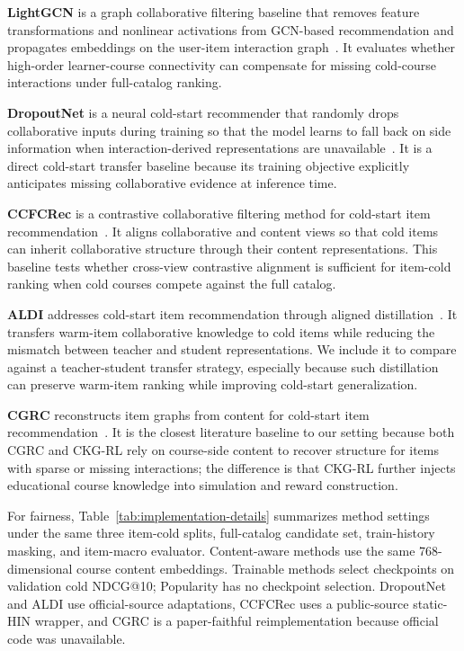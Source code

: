 \documentclass[sigconf,anonymous,review]{acmart}
\begin{document}
\textbf{LightGCN} is a graph collaborative filtering baseline that removes feature transformations and nonlinear activations from GCN-based recommendation and propagates embeddings on the user-item interaction graph~\cite{he2020lightgcn}. It evaluates whether high-order learner-course connectivity can compensate for missing cold-course interactions under full-catalog ranking.

\textbf{DropoutNet} is a neural cold-start recommender that randomly drops collaborative inputs during training so that the model learns to fall back on side information when interaction-derived representations are unavailable~\cite{volkovs2017dropoutnet}. It is a direct cold-start transfer baseline because its training objective explicitly anticipates missing collaborative evidence at inference time.

\textbf{CCFCRec} is a contrastive collaborative filtering method for cold-start item recommendation~\cite{zhou2023ccfcrec}. It aligns collaborative and content views so that cold items can inherit collaborative structure through their content representations. This baseline tests whether cross-view contrastive alignment is sufficient for item-cold ranking when cold courses compete against the full catalog.

\textbf{ALDI} addresses cold-start item recommendation through aligned distillation~\cite{huang2023aldi}. It transfers warm-item collaborative knowledge to cold items while reducing the mismatch between teacher and student representations. We include it to compare against a teacher-student transfer strategy, especially because such distillation can preserve warm-item ranking while improving cold-start generalization.

\textbf{CGRC} reconstructs item graphs from content for cold-start item recommendation~\cite{kim2024cgrc}. It is the closest literature baseline to our setting because both CGRC and CKG-RL rely on course-side content to recover structure for items with sparse or missing interactions; the difference is that CKG-RL further injects educational course knowledge into simulation and reward construction.

For fairness, Table~\ref{tab:implementation-details} summarizes method settings under the same three item-cold splits, full-catalog candidate set, train-history masking, and item-macro evaluator. Content-aware methods use the same 768-dimensional course content embeddings. Trainable methods select checkpoints on validation cold NDCG@10; Popularity has no checkpoint selection. DropoutNet and ALDI use official-source adaptations, CCFCRec uses a public-source static-HIN wrapper, and CGRC is a paper-faithful reimplementation because official code was unavailable.
\end{document}
